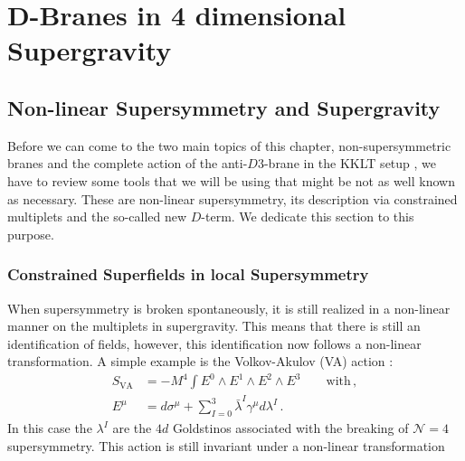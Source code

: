 \documentclass[12pt]{report}
\newcommand{\bea}{\begin{equation}\begin{aligned}}
\newcommand{\eea}{\end{aligned}\end{equation}}
\begin{document}

\chapter{D-Branes in 4 dimensional Supergravity}
\label{sec:antiD3}

\section{Non-linear Supersymmetry and Supergravity}%
\label{sec:multiplets}
Before we can come to the two main topics of this chapter, non-supersymmetric branes \cite{Cribiori:2020bgt} and the complete action of the anti-$D3$-brane in the KKLT setup \cite{Cribiori:2019hod}, we have to review some tools that we will be using that might be not as well known as necessary. These are non-linear supersymmetry, its description via constrained multiplets and the so-called new $D$-term. We dedicate this section to this purpose.
\subsection{Constrained Superfields in local Supersymmetry}
When supersymmetry is broken spontaneously, it is still realized in a non-linear manner on the multiplets in supergravity. This means that there is still an identification of fields, however, this identification now follows a non-linear transformation. A simple example is the Volkov-Akulov (VA) action \cite{Volkov:1972jx}:
\bea
S_{\text{VA}} &= -M^4 \int E^0 \wedge E^1 \wedge E^2 \wedge E^3\qquad \text{with}\,,\\
E^\mu &= d\sigma^\mu + \sum_{I=0}^3 \bar{\lambda}^I \gamma^\mu d\lambda^I\,.
\label{eq:VAorigin}
\eea
In this case the $\lambda^I$ are the $4d$ Goldstinos associated with the breaking of $\mathcal{N}=4$ supersymmetry. This action is still invariant under a non-linear transformation
\end{document}

